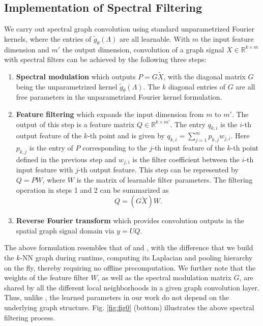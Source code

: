 \documentclass[runningheads]{llncs}
\begin{document}
\subsection{Implementation of Spectral Filtering}
We carry out spectral graph convolution using standard unparametrized Fourier kernels, where the entries of $\tilde{g}_{\theta}(\Lambda)$ are all learnable. With $m$ the input feature dimension and $m'$ the output dimension, convolution of a graph signal $X \in \mathbb{R}^{k \times m}$ with spectral filters can be achieved by the following three steps:
\begin{enumerate}
\item \textbf{Spectral modulation} which outputs $P = G \tilde{X}$, with the diagonal matrix $G$ being the unparametrized kernel $\tilde{g}_{\theta}(\Lambda)$. The $k$ diagonal entries of $G$ are all free parameters in the unparametrized Fourier kernel formulation.
\item \textbf{Feature filtering} which expands the input dimension from $m$ to $m'$. The output of this step is a feature matrix $Q \in  \mathbb{R}^{k \times m'} $. The entry $q_{k,i}$ is the $i$-th output feature of the $k$-th point and is given by $q_{k,i} = \sum_{j = 1}^m p_{k , j} w_{j , i}.$
Here $p_{k , j}$ is the entry of $P$ corresponding to the $j$-th input feature of the $k$-th point defined in the previous step and $w_{j,i}$ is the filter coefficient between the $i$-th input feature with $j$-th output feature. This step can be represented by $Q = P W$,
where $W$ is the matrix of learnable filter parameters.
The filtering operation in steps 1 and 2 can be summarized as 
\begin{equation}
Q = (G \tilde{X}) W.
\end{equation}

\item \textbf{Reverse Fourier transform} which provides convolution outputs in the spatial graph signal domain via $y = U Q $.
\end{enumerate}
The above formulation resembles that of \cite{defferrard2016convolutional} and \cite{kipf2016semi}, with the difference that we build the $k$-NN graph during runtime, computing its Laplacian and pooling hierarchy on the fly, thereby requiring no offline precomputation. We further note that the weights of the feature filter $W$, as well as the spectral modulation matrix $G$, are shared by all the different local neighborhoods in a given graph convolution layer. Thus, unlike \cite{defferrard2016convolutional,kipf2016semi}, the learned parameters in our work do not depend on the underlying graph structure. Fig. \ref{fig:fig0} (bottom) illustrates the above spectral filtering process.
\end{document}
